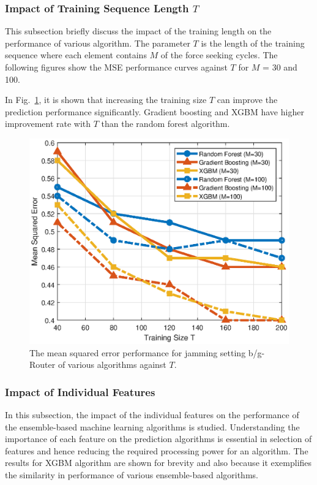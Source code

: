 \subsubsection{Impact of Training Sequence Length $T$}
This subsection briefly discuss the impact of the training length on the performance of various algorithm. The parameter $T$ is the length of the training sequence where each element contains $M$ of the force seeking cycles. The following figures show the MSE performance curves against $T$ for $M$ = 30 and 100. 

In Fig.~\ref{ftml-jrnl:fig:001_MSE_T}, it is shown that increasing the training size $T$ can improve the prediction performance significantly. Gradient boosting and XGBM have higher improvement rate with $T$ than the random forest algorithm. 

\begin{figure}[!ht]
	\centering
	\includegraphics[width=0.75\columnwidth]{./chapter-ftml/plots/001_MSE_T.eps}
	\caption{The mean squared error performance for jamming setting b/g-Router of various algorithms against $T$.}
	\label{ftml-jrnl:fig:001_MSE_T}      
\end{figure}


\subsubsection{Impact of Individual Features}
In this subsection, the impact of the individual features on the performance of the ensemble-based machine learning algorithms is studied. Understanding the importance of each feature on the prediction algorithms is essential in selection of features and hence reducing the required processing power for an algorithm. The results for XGBM algorithm are shown for brevity and also because it exemplifies the similarity in performance of various ensemble-based algorithms. 

